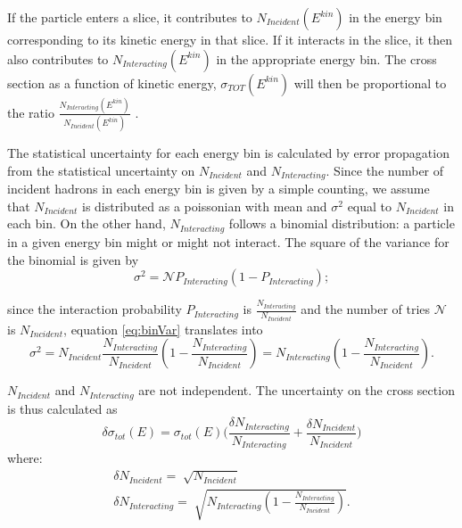 {If the particle enters a slice, it contributes to $N_{Incident}( E^{kin})$ in the energy bin corresponding to its kinetic energy in that slice. If it interacts in the slice, it then also contributes to $N_{Interacting}(E^{kin})$ in the appropriate energy bin. The cross section as a function of kinetic energy, $\sigma_{TOT}( E^{kin})$ will then be proportional to the ratio $\frac{N_{Interacting}( E^{kin})}{N_{Incident}( E^{kin})}$ .


The statistical uncertainty for each energy bin is calculated by error propagation from the statistical  uncertainty on $N_{Incident}$ and $N_{Interacting}$. 
Since the number of incident hadrons in each energy bin is given by a simple counting, we assume that $N_{Incident}$ is distributed as a poissonian with mean and $\sigma^2$ equal to $N_{Incident}$ in each bin.  
On the other hand, $N_{Interacting}$ follows a binomial distribution: a particle in a given energy bin might or might not interact.  The square of the variance for the binomial is given by  
\begin{equation}
\sigma^2 = \mathcal{N}P_{Interacting}(1-P_{Interacting});
\label{eq:binVar}
\end{equation}

since the interaction probability $P_{Interacting}$ is $\frac{ N_{Interacting}}{N_{Incident}}$ and the number of tries $\mathcal{N}$ is $N_{Incident}$, equation \ref{eq:binVar} translates into
\begin{equation}
\sigma^2 = N_{Incident}\frac{ N_{Interacting}}{N_{Incident}} (1-\frac{ N_{Interacting}}{N_{Incident}}) = N_{Interacting}(1-\frac{ N_{Interacting}}{N_{Incident}}).
\end{equation}

$N_{Incident}$ and $N_{Interacting}$ are not independent.
The uncertainty on the cross section is thus calculated as 
\begin{equation}
\delta\sigma_{tot}(E) = \sigma_{tot}(E) \Big(\frac{\delta N_{Interacting}}{N_{Interacting}}+\frac{\delta N_{Incident}}{N_{Incident}}\Big) 
\end{equation}
where:
\begin{eqnarray}
\delta N_{Incident} = \sqrt[]{N_{Incident}} \\
\delta N_{Interacting} = \sqrt[]{N_{Interacting}(1-\frac{ N_{Interacting}}{N_{Incident}})}.
\end{eqnarray}





}
